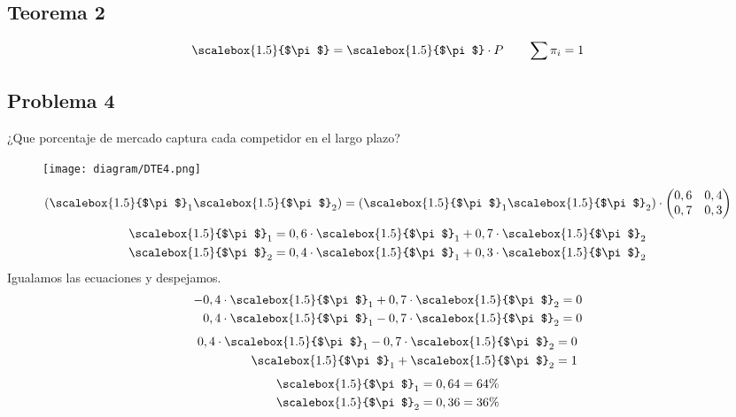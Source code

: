 \documentclass{templateNote}
\begin{document}
\subsection{Teorema 2}
\begin{equation*}
    \scalebox{1.5}{$\pi$} = \scalebox{1.5}{$\pi$} \cdot P \qquad \sum{\pi_i} = 1
\end{equation*}

\subsection{Problema 4}
¿Que porcentaje de mercado captura cada competidor en el largo plazo?
\begin{figure}[H]
    \centering
    \texttt{[image: diagram/DTE4.png]}
\end{figure}
\begin{equation*}
    \left(\scalebox{1.5}{$\pi$}_1 \scalebox{1.5}{$\pi$}_2\right) = \left(\scalebox{1.5}{$\pi$}_1 \scalebox{1.5}{$\pi$}_2\right) \cdot \left(\begin{matrix}
        0,6 & 0,4 \\
        0,7 & 0,3
    \end{matrix}\right)
\end{equation*}
\begin{eqnarray*}
    \scalebox{1.5}{$\pi$}_1 &= 0,6 \cdot \scalebox{1.5}{$\pi$}_1 + 0,7 \cdot \scalebox{1.5}{$\pi$}_2 \\
    \scalebox{1.5}{$\pi$}_2 &= 0,4 \cdot \scalebox{1.5}{$\pi$}_1 + 0,3 \cdot \scalebox{1.5}{$\pi$}_2
\end{eqnarray*}
Igualamos las ecuaciones y despejamos.
\begin{eqnarray*}
    - 0,4 \cdot \scalebox{1.5}{$\pi$}_1 + 0,7 \cdot \scalebox{1.5}{$\pi$}_2 &= 0\\
    0,4 \cdot \scalebox{1.5}{$\pi$}_1 - 0,7 \cdot \scalebox{1.5}{$\pi$}_2 &= 0
\end{eqnarray*}
\begin{eqnarray*}
    0,4 \cdot \scalebox{1.5}{$\pi$}_1 - 0,7 \cdot \scalebox{1.5}{$\pi$}_2 &= 0 \\
    \scalebox{1.5}{$\pi$}_1 + \scalebox{1.5}{$\pi$}_2 &= 1
\end{eqnarray*}
\begin{eqnarray*}
    \scalebox{1.5}{$\pi$}_1 &= 0,64 = 64\% \\
    \scalebox{1.5}{$\pi$}_2 &= 0,36 = 36\%
\end{eqnarray*}
\end{document}
